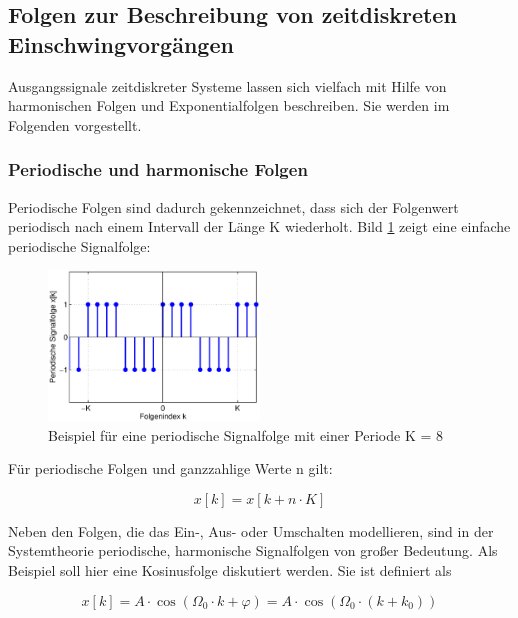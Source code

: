 \clearpage

\subsection{Folgen zur Beschreibung von zeitdiskreten Einschwingvorg\"{a}ngen}

\noindent Ausgangssignale zeitdiskreter Systeme lassen sich vielfach mit Hilfe von harmonischen Folgen und Exponentialfolgen beschreiben. Sie werden im Folgenden vorgestellt.

\subsubsection{Periodische und harmonische Folgen}

\noindent Periodische Folgen sind dadurch gekennzeichnet, dass sich der Folgenwert periodisch nach einem Intervall der L\"{a}nge K wiederholt. Bild \ref{fig:PeriodischFolge} zeigt eine einfache periodische Signalfolge:

\begin{figure}[H]
  \centerline{\includegraphics[width=0.5\textwidth]{Kapitel3/Bilder/image19.eps}}
  \caption{Beispiel f\"{u}r eine periodische Signalfolge mit einer Periode K = 8}
  \label{fig:PeriodischFolge}
\end{figure}

\noindent F\"{u}r periodische Folgen und ganzzahlige Werte n gilt:

\begin{equation}\label{eq:threefourtynine}
x\left[k\right]=x\left[k+n\cdot K\right]
\end{equation}

\noindent Neben den Folgen, die das Ein-, Aus- oder Umschalten modellieren, sind in der Systemtheorie periodische, harmonische Signalfolgen von gro{\ss}er Bedeutung. Als Beispiel soll hier eine Kosinusfolge diskutiert werden. Sie ist definiert als

\begin{equation}\label{eq:threefifty}
x\left[k\right]=A\cdot \cos \left(\Omega _{0} \cdot k+\varphi \right)=A\cdot \cos \left(\Omega _{0} \cdot \left(k+k_{0} \right)\right)
\end{equation}

